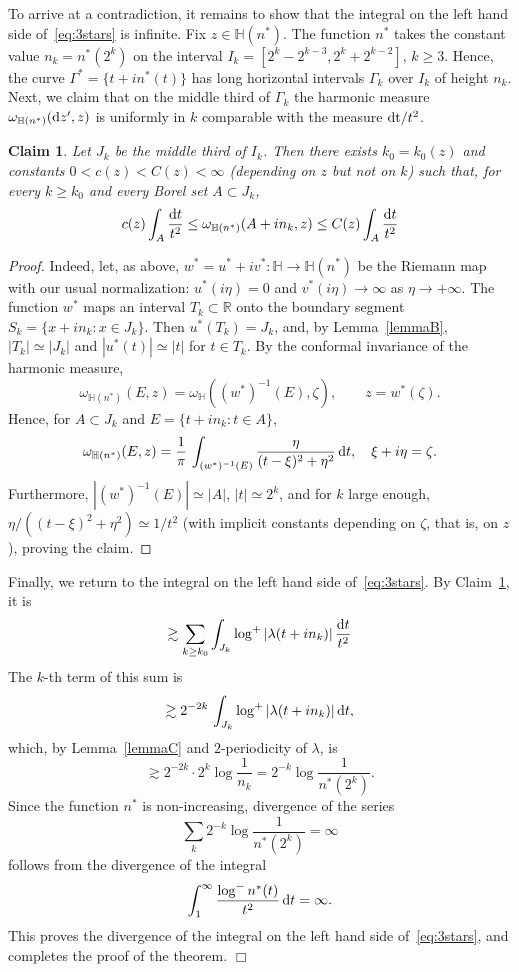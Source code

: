 \documentclass[12pt]{paper}
\newtheorem{claim}[theorem]{Claim}
\newcommand{\bR}{\mathbb R}
\newcommand{\bH}{\mathbb H}
\begin{document}
To arrive at a contradiction,  it remains to show that the integral on the left hand side 
of~\eqref{eq:3stars} is infinite. 
Fix $z\in \bH(n^*)$. The function $n^*$ takes the constant value 
$n_k=n^*(2^k)$
on the interval $I_k=[2^k - 2^{k-3}, 2^k + 2^{k-2}]$, $k\ge 3$. 
Hence, the curve $\Gamma^*=\{t+in^*(t)\}$ 
has long horizontal intervals $\Gamma_k$ over $I_k$ of height $n_k$. 
Next, we claim that on the middle third of $\Gamma_k$ the harmonic measure  
$\omega_{\bH (n^*)}({\rm d}z', z)$ is uniformly in $k$ comparable with the measure ${\rm d t}/t^2$.
\begin{claim}\label{claim:harm_measure}
Let $J_k$ be the middle third of $I_k$. Then
there exists $k_0=k_0(z)$ and constants
$0<c(z)< C(z)<\infty$ {\rm (}depending on $z$ but not on $k${\rm )} such that, for every $k\ge k_0$ and every Borel set
$A\subset J_k$, 
\[
c(z) \int_A \frac{{\rm d}t}{t^2} \le \omega_{\bH (n^*)}(A+in_k, z) 
\le C(z) \int_A \frac{{\rm d}t}{t^2}
\]
\end{claim}
\begin{proof}Indeed, let, as above, $w^*=u^*+iv^*\colon \bH \to \bH(n^*)$ be the Riemann map with our usual normalization:
$u^*(i\eta) = 0$ and $v^*(i\eta)\to \infty$ as $\eta\to +\infty$. 
The function $w^*$ maps an interval $T_k\subset \bR$ onto the boundary segment $S_k=\{x+in_k\colon x\in J_k\}$.
Then $u^*(T_k)=J_k$, and, by Lemma~\ref{lemmaB}, $|T_k| \simeq |J_k|$ and $|u^*(t)| \simeq |t|$ for $t\in T_k$. 
By the conformal invariance of the harmonic measure,
\[ \omega_{\bH (n^*)}(E, z) = \omega_{\bH} ((w^*)^{-1}(E), \zeta), \qquad z=w^*(\zeta).\] 
Hence, for $A\subset J_k$ and $E=\{t+in_k\colon t\in A\}$,
\[
\omega_{\bH (n^*)}(E, z) = \frac1\pi\,
\int_{(w^*)^{-1}(E)} \frac{\eta}{(t-\xi)^2 + \eta^2}\, {\rm d}t, \quad \xi+i\eta = \zeta.
\] 
Furthermore, $|(w^*)^{-1}(E)| \simeq |A|$, $|t|\simeq 2^k$, and for $k$ large enough,
$ \eta/((t-\xi)^2 + \eta^2) \simeq 1/t^2$ (with implicit constants depending on $\zeta$, that is, on $z$),
proving the claim.
\end{proof}

\smallskip Finally, we return to the integral on the left hand side of~\eqref{eq:3stars}. By Claim~\ref{claim:harm_measure}, 
it is 
\[
\gtrsim  \sum_{k\ge k_0} \int_{J_k} \log^+ |\lambda (t+in_k)|\,
\frac{{\rm d}t}{t^2}
\]
The $k$-th term of this sum is
\[
\gtrsim 2^{-2k}\, \int_{J_k} \log^+ |\lambda (t+in_k)|\, {\rm d}t,
\]
which, by Lemma~\ref{lemmaC} and $2$-periodicity of $\lambda$, is 
\[
\gtrsim 2^{-2k} \cdot 2^k \log\frac1{n_k} =
 2^{-k} \log \frac1{n^*(2^k)}.
\]
Since the function $n^*$ is non-increasing, divergence of the series
\[
\sum_k  2^{-k} \log \frac1{n^*(2^k)} = \infty
\]
follows from the divergence of the integral
\[
\int_1^\infty \frac{\log^- n^*(t)}{t^2}\, {\rm d}t  = \infty.
\]
This proves the divergence of the integral on the left hand side of~\eqref{eq:3stars}, and completes the
proof of the theorem. \mbox{}\hfill $\Box$
\end{document}
